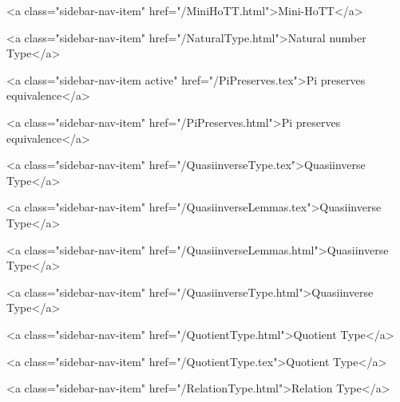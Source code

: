       
        
          <a class="sidebar-nav-item" href="/MiniHoTT.html">Mini-HoTT</a>
        
      
    
      
        
          <a class="sidebar-nav-item" href="/NaturalType.html">Natural number Type</a>
        
      
    
      
        
          <a class="sidebar-nav-item active" href="/PiPreserves.tex">Pi preserves equivalence</a>
        
      
    
      
        
          <a class="sidebar-nav-item" href="/PiPreserves.html">Pi preserves equivalence</a>
        
      
    
      
        
          <a class="sidebar-nav-item" href="/QuasiinverseType.tex">Quasiinverse Type</a>
        
      
    
      
        
          <a class="sidebar-nav-item" href="/QuasiinverseLemmas.tex">Quasiinverse Type</a>
        
      
    
      
        
          <a class="sidebar-nav-item" href="/QuasiinverseLemmas.html">Quasiinverse Type</a>
        
      
    
      
        
          <a class="sidebar-nav-item" href="/QuasiinverseType.html">Quasiinverse Type</a>
        
      
    
      
        
          <a class="sidebar-nav-item" href="/QuotientType.html">Quotient Type</a>
        
      
    
      
        
          <a class="sidebar-nav-item" href="/QuotientType.tex">Quotient Type</a>
        
      
    
      
        
          <a class="sidebar-nav-item" href="/RelationType.html">Relation Type</a>
        
